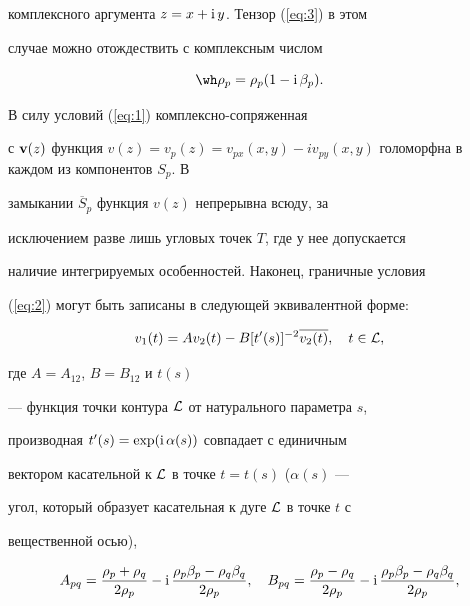 комплексного аргумента $z=x+\mathrm i\, y$. Тензор (\ref{eq:3}) в этом


случае можно отождествить с комплексным числом


\begin{equation} 


\wh\rho_p =\rho_p(1-\i \beta_p).\label{eq:4}


\end{equation}


В силу условий (\ref{eq:1}) комплексно-сопряженная


с ${\bold v}(z)$ функция $v(z) = v_{p}(z) = v_{px}(x,y)


- iv_{py}(x,y)$ голоморфна в каждом из компонентов $S_p$. В


замыкании $\overline{S}_p$ функция $v(z)$ непрерывна всюду, за


исключением разве лишь угловых точек $T$, где у нее допускается


наличие интегрируемых особенностей. Наконец, граничные условия


(\ref{eq:2}) могут быть записаны в следующей эквивалентной форме:


\begin{equation} 


v_1(t)=Av_2(t)-B[t'(s)]^{-2}\overline{v_{2}(t)},\quad t\in {\cal


L},\label{eq:5}


\end{equation}


где $A=A_{12}$, $B=B_{12}$ и $t(s)$


--- функция точки контура ${\cal L}$ от натурального параметра $s$,


производная $t'(s)=\exp(\mathrm i\,\alpha(s))$ совпадает с единичным


вектором касательной к ${\cal L}$ в точке $t=t(s)$ ($\alpha(s)$ ---


угол, который образует касательная к дуге ${\cal L}$ в точке $t$ с


вещественной осью),


\begin{equation} %


A_{pq}=\frac{\rho_p+\rho_q}{2\rho_p}-


\i \frac{\rho_p\beta_p-\rho_q\beta_q}{2\rho_p},\quad


B_{pq}=\frac{\rho_p-\rho_q}{2\rho_p}-


\i \frac{\rho_p\beta_p-\rho_q\beta_q}{2\rho_p},


\label{eq:6}


\end{equation}


